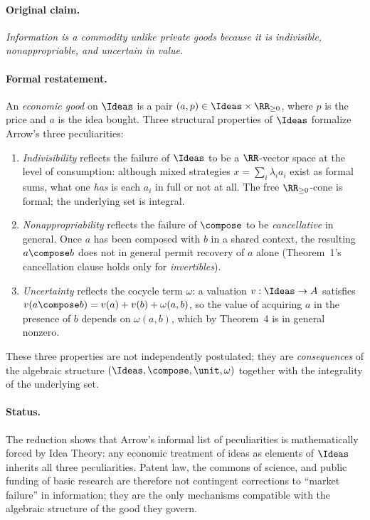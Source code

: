 \paragraph{Original claim.} \emph{Information is a commodity unlike
private goods because it is indivisible, nonappropriable, and uncertain
in value.}

\paragraph{Formal restatement.} An \emph{economic good} on $\Ideas$ is a
pair $(a,p)\in \Ideas \times \RR_{\geq 0}$, where $p$ is the price and
$a$ is the idea bought. Three structural properties of $\Ideas$
formalize Arrow's three peculiarities:
\begin{enumerate}
\item \emph{Indivisibility} reflects the failure of $\Ideas$ to be a
$\RR$-vector space at the level of consumption: although mixed strategies
$x = \sum_i \lambda_i a_i$ exist as formal sums, what one \emph{has} is
each $a_i$ in full or not at all. The free $\RR_{\geq 0}$-cone is
formal; the underlying set is integral.
\item \emph{Nonappropriability} reflects the failure of $\compose$ to be
\emph{cancellative} in general. Once $a$ has been composed with $b$ in a
shared context, the resulting $a\compose b$ does not in general permit
recovery of $a$ alone (Theorem~1's cancellation clause holds only for
\emph{invertibles}).
\item \emph{Uncertainty} reflects the cocycle term $\omega$: a
valuation $v:\Ideas\to A$ satisfies $v(a\compose b) = v(a)+v(b)+
\omega(a,b)$, so the value of acquiring $a$ in the presence of $b$
depends on $\omega(a,b)$, which by Theorem~4 is in general nonzero.
\end{enumerate}

These three properties are not independently postulated; they are
\emph{consequences} of the algebraic structure $(\Ideas,\compose,\unit,
\omega)$ together with the integrality of the underlying set.

\paragraph{Status.} The reduction shows that Arrow's informal list of
peculiarities is mathematically forced by Idea Theory: any economic
treatment of ideas as elements of $\Ideas$ inherits all three
peculiarities. Patent law, the commons of science, and public funding of
basic research are therefore not contingent corrections to ``market
failure'' in information; they are the only mechanisms compatible with
the algebraic structure of the good they govern.

